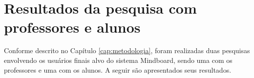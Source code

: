 


\chapter{Resultados da pesquisa com professores e alunos}
\label{cap:resultados_pesquisa_professores_alunos}

Conforme descrito no Capítulo \ref{cap:metodologia}, foram realizadas duas pesquisas envolvendo os usuários finais alvo do sistema Mindboard, sendo uma com os professores e uma com os alunos. A seguir são apresentados seus resultados.







